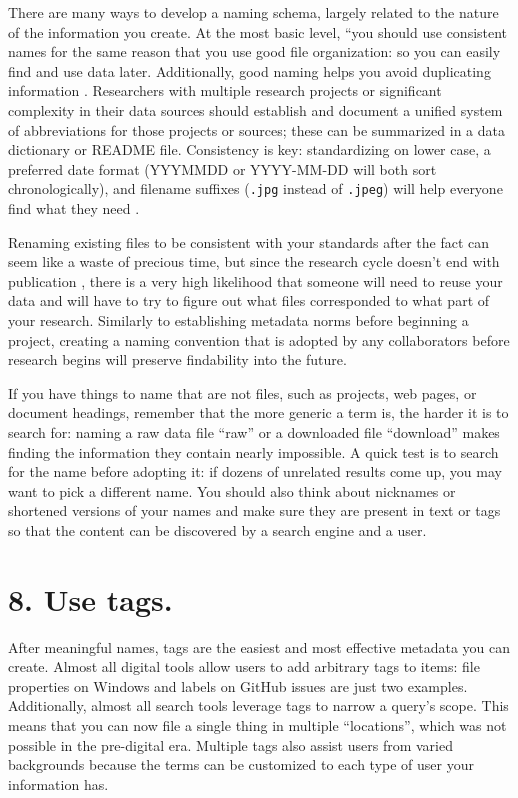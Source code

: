 \documentclass[10pt,letterpaper]{article}
\newcommand{\rulemajor}[1]{\section*{#1}}
\begin{document}
There are many ways to develop a naming schema, largely related to the nature of
the information you create. At the most basic level, ``you should use consistent
names for the same reason that you use good file organization: so you can easily
find and use data later. Additionally, good naming helps you avoid duplicating
information \cite{Briney2015}. Researchers with multiple research projects or
significant complexity in their data sources should establish and document a
unified system of abbreviations for those projects or sources; these can be
summarized in a data dictionary or README file. Consistency is key:
standardizing on lower case, a preferred date format (YYYMMDD or YYYY-MM-DD will
both sort chronologically), and filename suffixes (\texttt{.jpg} instead of
\texttt{.jpeg}) will help everyone find what they need \cite{Wilson2014,Wilson2017}.

Renaming existing files to be consistent with your standards after the fact can
seem like a waste of precious time, but since the research cycle doesn't end
with publication \cite{Briney2015}, there is a very high likelihood that someone
will need to reuse your data and will have to try to figure out what files
corresponded to what part of your research.
Similarly to establishing metadata norms before beginning a project, creating a naming convention that is adopted by any collaborators before research begins will preserve findability into the future.

If you have things to name that are not files, such as projects, web pages, or
document headings, remember that the more generic a term is, the harder it is to
search for: naming a raw data file ``raw'' or a downloaded file ``download''
makes finding the information they contain nearly impossible. A quick test is to
search for the name before adopting it: if dozens of unrelated results come up,
you may want to pick a different name. You should also think about nicknames or
shortened versions of your names and make sure they are present in text or tags
so that the content can be discovered by a search engine and a user.

\rulemajor{8. Use tags.}

After meaningful names, tags are the easiest and most effective metadata you can
create.  Almost all digital tools allow users to add arbitrary tags to items:
file properties on Windows and labels on GitHub issues are just two examples.
Additionally, almost all search tools leverage tags to narrow a query's
scope. This means that you can now file a single thing in multiple
``locations'', which was not possible in the pre-digital era. Multiple tags also
assist users from varied backgrounds because the terms can be customized to each
type of user your information has.
\end{document}
